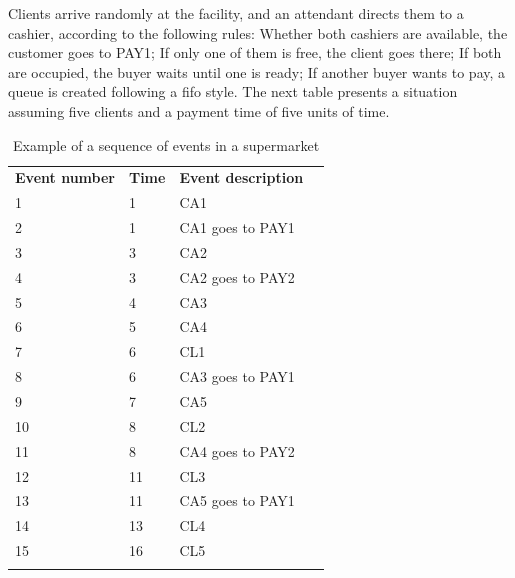 Clients arrive randomly at the facility, and an attendant directs them to a cashier, according to the following rules: Whether both cashiers 
are available, the customer goes to PAY1; If only one of them is free, the client goes there; If both are occupied, the buyer waits until one is 
ready; If another buyer wants to pay, a queue is created following a \gls{fifo} style. The next table presents a situation assuming five clients 
and a payment time of five units of time. 

\begin{table}[H]
\centering
\begin{tabular}{llll}
\cline{1-3}
\multicolumn{1}{|l|}{\cellcolor[HTML]{9B9B9B}\textbf{Event number}} & \multicolumn{1}{l|}{\cellcolor[HTML]{9B9B9B}\textbf{Time}} & \multicolumn{1}{l|}{\cellcolor[HTML]{9B9B9B}\textbf{Event description}} &  \\ \cline{1-3}
\multicolumn{1}{|l|}{1} & \multicolumn{1}{l|}{1} & \multicolumn{1}{l|}{CA1} &  \\ \cline{1-3}
\multicolumn{1}{|l|}{2} & \multicolumn{1}{l|}{1} & \multicolumn{1}{l|}{CA1 goes to PAY1} &  \\ \cline{1-3}
\multicolumn{1}{|l|}{3} & \multicolumn{1}{l|}{3} & \multicolumn{1}{l|}{CA2} &  \\ \cline{1-3}
\multicolumn{1}{|l|}{4} & \multicolumn{1}{l|}{3} & \multicolumn{1}{l|}{CA2 goes to PAY2} &  \\ \cline{1-3}
\multicolumn{1}{|l|}{5} & \multicolumn{1}{l|}{4} & \multicolumn{1}{l|}{CA3} &  \\ \cline{1-3}
\multicolumn{1}{|l|}{6} & \multicolumn{1}{l|}{5} & \multicolumn{1}{l|}{CA4} &  \\ \cline{1-3}
\multicolumn{1}{|l|}{7} & \multicolumn{1}{l|}{6} & \multicolumn{1}{l|}{CL1} &  \\ \cline{1-3}
\multicolumn{1}{|l|}{8} & \multicolumn{1}{l|}{6} & \multicolumn{1}{l|}{CA3 goes to PAY1} &  \\ \cline{1-3}
\multicolumn{1}{|l|}{9} & \multicolumn{1}{l|}{7} & \multicolumn{1}{l|}{CA5} &  \\ \cline{1-3}
\multicolumn{1}{|l|}{10} & \multicolumn{1}{l|}{8} & \multicolumn{1}{l|}{CL2} &  \\ \cline{1-3}
\multicolumn{1}{|l|}{11} & \multicolumn{1}{l|}{8} & \multicolumn{1}{l|}{CA4 goes to PAY2} &  \\ \cline{1-3}
\multicolumn{1}{|l|}{12} & \multicolumn{1}{l|}{11} & \multicolumn{1}{l|}{CL3} &  \\ \cline{1-3}
\multicolumn{1}{|l|}{13} & \multicolumn{1}{l|}{11} & \multicolumn{1}{l|}{CA5 goes to PAY1} &  \\ \cline{1-3}
\multicolumn{1}{|l|}{14} & \multicolumn{1}{l|}{13} & \multicolumn{1}{l|}{CL4} &  \\ \cline{1-3}
\multicolumn{1}{|l|}{15} & \multicolumn{1}{l|}{16} & \multicolumn{1}{l|}{CL5} &  \\ \cline{1-3}
 &  &  & 
\end{tabular}
\caption{Example of a sequence of events in a supermarket}
\label{tab_DESexample}
\end{table}

